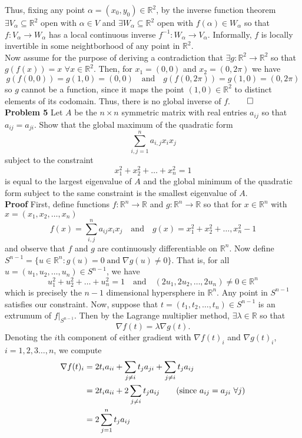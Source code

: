 \documentclass[11pt, letterpaper]{article}
\newcommand{\mbb}[1]{\mathbb{#1}}
\begin{document}
    Thus, fixing any point $\alpha=(x_0,y_0)\in\mbb{R}^2$, by the inverse function theorem $\exists V_{\alpha}\subseteq\mbb{R}^2$ open with $\alpha\in V$ and 
    $\exists W_\alpha\subseteq\mbb{R}^2$ open with $f(\alpha)\in W_\alpha$ so that $f:V_\alpha\rightarrow W_\alpha$ has a local continuous inverse $f^{-1}:W_\alpha\rightarrow V_\alpha$. Informally,
    $f$ is locally invertible in some neightborhood of any point in $\mbb{R}^2$.\\[10pt]
    Now assume for the purpose of deriving a contradiction that $\exists g:\mbb{R}^2\rightarrow\mbb{R}^2$ so that $g(f(x))=x$ $\forall x\in\mbb{R}^2$. Then, for
    $x_1=(0, 0)$ and $x_2=(0, 2\pi)$ we have
    \[g(f(0,0))=g(1,0)=(0,0)\quad\text{and}\quad g(f(0,2\pi))=g(1,0)=(0,2\pi)\]
    so $g$ cannot be a function, since it maps the point $(1,0)\in\mbb{R}^2$ to distinct elements of its codomain. Thus, there is no global inverse of $f$.\hfill{$\qed$}\\[10pt]
    {\bf Problem 5} Let $A$ be the $n\times n$ symmetric matrix with real entries $a_{ij}$ so that $a_{ij}=a_{ji}$. Show that the global maximum of the quadratic form 
    \[\sum_{i,j=1}^na_{i,j}x_ix_j\]
    subject to the constraint 
    \[x_1^2+x_2^2+\dots+x_n^2=1\]
    is equal to the largest eigenvalue of $A$ and the global minimum of the quadratic form subject to the same constraint is the smallest eigenvalue of $A$.\\[10pt]
    {\bf Proof} First, define functions $f:\mbb{R}^n\rightarrow\mbb{R}$ and $g:\mbb{R}^n\rightarrow\mbb{R}$ so that for $x\in\mbb{R}^n$ with $x=(x_1,x_2,\dots,x_n)$
    \[f(x)=\sum_{i,j}^na_{ij}x_ix_j\quad\text{and}\quad g(x)=x_1^2+x_2^2+\dots,x_n^2-1\]
    and observe that $f$ and $g$ are continuously differentiable on $\mbb{R}^n$. Now define $S^{n-1}=\{u\in\mbb{R}^n:g(u)=0\;\text{and}\;\nabla g(u)\neq 0\}$. That is, for all $u=(u_1,u_2,\dots,u_n)\in S^{n-1}$, we have
    \[u_1^2+u_2^2+\dots+u_n^2=1\quad\text{and}\quad (2u_1,2u_2,\dots,2u_n)\neq 0\in\mbb{R}^n\]
    which is precisely the $n-1$ dimensional hypersphere in $\mbb{R}^n$. Any point in $S^{n-1}$ satisfies our constraint. Now, suppose that $t=(t_1,t_2,\dots, t_n)\in S^{n-1}$ is an extrumum of $f|_{S^{n-1}}$. Then by the Lagrange multiplier method, $\exists \lambda\in\mbb{R}$ so that
    \[\nabla f(t)=\lambda\nabla g(t).\tag{2}\]
    Denoting the $i$th component of either gradient with $\nabla f(t)_i$ and $\nabla g(t)_i$, $i=1,2,3\dots,n$, we compute
    \begin{align*}
        \nabla f(t)_i&=2t_ia_{ii}+\sum_{j\neq i}t_ja_{ji}+\sum_{j\neq i}t_ja_{ij}\\
        &=2t_ia_{ii}+2\sum_{j\neq i}t_ja_{ij}\tag{since $a_{ij}=a_{ji}$ $\forall j$}\\
        &=2\sum_{j=1}^nt_ja_{ij}
    \end{align*}
\end{document}
